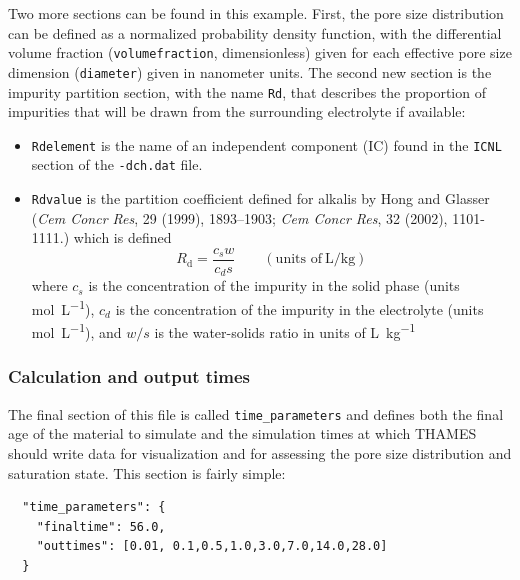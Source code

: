 \documentclass{article}
\begin{document}
{\normalsize{ }
Two more sections can be found in this example. First, the pore size
distribution can be defined as a normalized probability density function,
with the differential volume fraction (\verb!volumefraction!, dimensionless)
given for each effective pore size dimension (\verb!diameter!) given in
nanometer units. The second new section is the impurity partition section,
with the name \verb!Rd!, that describes the proportion of impurities that will
be drawn from the surrounding electrolyte if available:
\begin{itemize}
	\item \verb!Rdelement! is the name of an independent component (IC)
	      found in the \verb!ICNL! section of the \verb!-dch.dat! file.
	\item \verb!Rdvalue! is the partition coefficient defined for
	      alkalis by Hong and Glasser (\textit{Cem Concr Res}, 29 (1999), 1893--1903;
	      \textit{Cem Concr Res}, 32 (2002), 1101-1111.) which is defined
	      \begin{equation}
		      R_\text{d} = \frac{c_s w}{c_d s} \qquad (\text{units of}\
		      \unit{\liter\per\kilo\gram})
	      \end{equation}
	      where $c_s$ is the concentration of the impurity in the solid phase
	      (units \unit{\mole\per\liter}), $c_d$ is the concentration of the impurity
	      in the electrolyte (units \unit{\mole\per\liter}), and $w/s$ is the
	      water-solids ratio in units of \unit{\liter\per\kilo\gram}
\end{itemize}

\subsubsection{\label{sec:timeparams} Calculation and output times}
The final section of this file is called \verb!time_parameters! and defines
both the final age of the material to simulate and the simulation times at
which THAMES should write data for visualization and for assessing the
pore size distribution and saturation state. This section is fairly simple:

\scriptsize{
	\begin{lstlisting}
  "time_parameters": {
    "finaltime": 56.0,
    "outtimes": [0.01, 0.1,0.5,1.0,3.0,7.0,14.0,28.0]
  }
\end{lstlisting}
}

}
\end{document}
